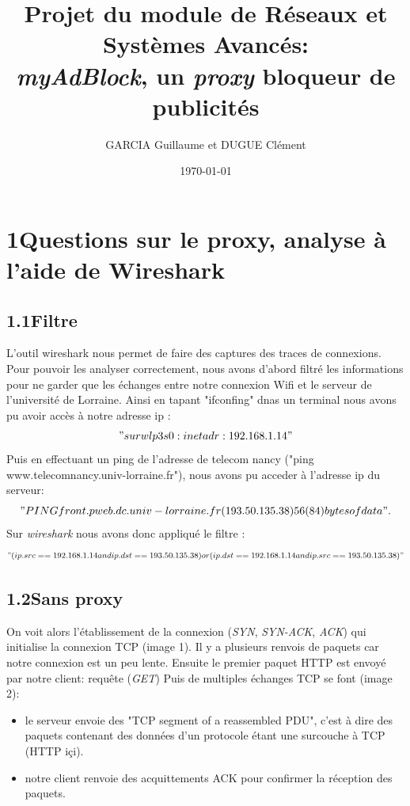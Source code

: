 \documentclass[12pt, a4paper]{report}
\title{Projet du module de Réseaux et Systèmes  Avancés:\\ \textit{myAdBlock}, un \textit{proxy} bloqueur de publicités}
\author{GARCIA  Guillaume et DUGUE Clément}
\date{\today}
\begin{document}
\maketitle

\hypersetup{linkcolor=blue}

\chapter*{1\hspace{1cm}Questions sur le proxy, analyse à l'aide de Wireshark}

\section*{\hspace{0.6cm}1.1\hspace{0.6cm}Filtre}
\hspace{1cm}L'outil wireshark nous permet de faire des captures des traces de connexions. Pour pouvoir les analyser correctement, nous avons d'abord filtré les informations pour ne garder que les échanges entre notre connexion Wifi et le serveur de l'université de Lorraine. Ainsi en tapant "ifconfing" dnas un terminal nous avons pu avoir accès à notre adresse ip : \["sur wlp3s0 : inet adr:192.168.1.14"\]
\hspace{1cm}Puis en effectuant un ping de l'adresse de telecom nancy ("ping www.telecomnancy.univ-lorraine.fr"), nous avons pu acceder à l'adresse ip du serveur: \["PING front.pweb.dc.univ-lorraine.fr (193.50.135.38) 56(84) bytes of data".\]
\hspace{1cm}Sur \textit{wireshark} nous avons donc appliqué le filtre :
\["(ip.src == 192.168.1.14 and ip.dst==193.50.135.38) or (ip.dst==192.168.1.14 and ip.src==193.50.135.38)"\]


\section*{\hspace{0.6cm}1.2\hspace{0.6cm}Sans proxy}
\hspace{1cm}On voit alors l'établissement de la connexion (\textit{SYN}, \textit{SYN-ACK}, \textit{ACK}) qui initialise la connexion TCP (image 1). Il y a plusieurs renvois de paquets car notre connexion est un peu lente. Ensuite le premier paquet HTTP est envoyé par notre client: requête (\textit{GET})
Puis de multiples échanges TCP se font (image 2):
\begin{itemize}
\item \hspace{0.2cm}le serveur envoie des "TCP segment of a reassembled PDU", c'est à dire des paquets contenant des données d'un protocole étant une surcouche à TCP (HTTP içi).
\item \hspace{0.2cm}notre client renvoie des acquittements ACK pour confirmer la réception des paquets.
\end{itemize}
\end{document}
